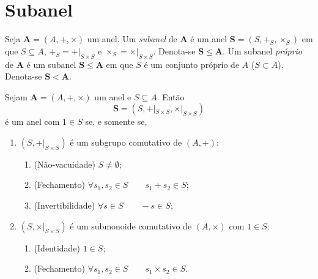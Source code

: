 \section{Subanel}

\begin{defi}
Seja $\bm A=(A,+,\times)$ um anel. Um \emph{subanel} de $\bm A$ é um anel $\bm S=(S,+_S,\times_S)$ em que $S \subseteq A$, $+_S = +|_{S \times S}$ e $\times_S = \times|_{S \times S}$. Denota-se $\bm S \leq \bm A$. Um subanel \emph{próprio} de $\bm A$ é um subanel $\bm S \leq \bm A$ em que $S$ é um conjunto próprio de $A$ ($S \subset A$). Denota-se $\bm S < \bm A$.
\end{defi}

\begin{prop}
Sejam $\bm A=(A,+,\times)$ um anel e $S \subseteq A$. Então
	\begin{equation*}
	\bm S=(S,+|_{S \times S},\times|_{S \times S})
	\end{equation*}
é um anel com $1 \in S$ se, e somente se,
	\begin{enumerate}
	\item $(S,+|_{S \times S})$ é um subgrupo comutativo de $(A,+)$:
			\begin{enumerate}
			\item (Não-vacuidade) $S \neq \emptyset$;
			\item (Fechamento) $\forall s_1,s_2 \in S \qquad s_1 + s_2 \in S$;
			\item (Invertibilidade) $\forall s \in S \qquad -s \in S$;
			\end{enumerate}
	\item $(S,\times|_{S \times S})$ é um submonoide comutativo de $(A,\times)$ com $1 \in S$:
			\begin{enumerate}
			\item (Identidade) $1 \in S$;
			\item (Fechamento) $\forall s_1,s_2 \in S \qquad s_1 \times s_2 \in S$.
			\end{enumerate}
	\end{enumerate}
\end{prop}
